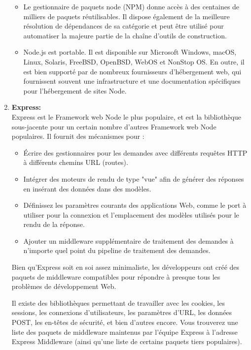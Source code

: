 \begin{enumerate}[label=(\alph*)]
\begin{itemize}
    \item Le gestionnaire de paquets node (NPM) donne accès à des centaines de milliers de paquets réutilisables. Il dispose également de la meilleure résolution de dépendances de sa catégorie et peut être utilisé pour automatiser la majeure partie de la chaîne d'outils de construction.\par
    \item Node.js est portable. Il est disponible sur Microsoft Windows, macOS, Linux, Solaris, FreeBSD, OpenBSD, WebOS et NonStop OS. En outre, il est bien supporté par de nombreux fournisseurs d'hébergement web, qui fournissent souvent une infrastructure et une documentation spécifiques pour l'hébergement de sites Node.\par
\end{itemize}
\item \textbf{Express:}\\
Express est le Framework web Node le plus populaire, et est la bibliothèque sous-jacente pour un certain nombre d'autres Framework web Node populaires. Il fournit des mécanismes pour :\par
\begin{itemize}
    \item Écrire des gestionnaires pour les demandes avec différents requêtes HTTP à différents chemins URL (routes).
    \item Intégrer des moteurs de rendu de type "vue" afin de générer des réponses en insérant des données dans des modèles.\par
    \item Définissez les paramètres courants des applications Web, comme le port à utiliser pour la connexion et l'emplacement des modèles utilisés pour le rendu de la réponse.\par
    \item Ajouter un middleware supplémentaire de traitement des demandes à n'importe quel point du pipeline de traitement des demandes.
\end{itemize}
Bien qu'Express soit en soi assez minimaliste, les développeurs ont créé des paquets de middleware compatibles pour répondre à presque tous les problèmes de développement Web. \par
Il existe des bibliothèques 	permettant de travailler avec les cookies, les sessions, les connexions 	d'utilisateurs, les paramètres d'URL, les données POST, les en-têtes de sécurité, et bien d'autres encore. Vous trouverez une liste des paquets de middleware maintenus par l'équipe Express à l'adresse Express 	Middleware (ainsi qu'une liste de certains paquets tiers populaires).\par
\end{enumerate}
